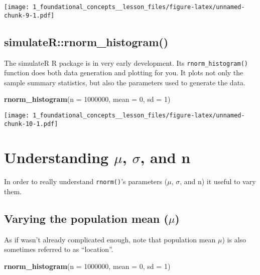 \documentclass[
]{article}
\newenvironment{Shaded}{\begin{snugshade}}{\end{snugshade}}
\newcommand{\AttributeTok}[1]{\textcolor[rgb]{0.13,0.29,0.53}{#1}}
\newcommand{\DecValTok}[1]{\textcolor[rgb]{0.00,0.00,0.81}{#1}}
\newcommand{\FunctionTok}[1]{\textcolor[rgb]{0.13,0.29,0.53}{\textbf{#1}}}
\newcommand{\NormalTok}[1]{#1}
\begin{document}
\texttt{[image: 1\_foundational\_concepts\_\_lesson\_files/figure-latex/unnamed-chunk-9-1.pdf]}

\hypertarget{simulaterrnorm_histogram}{%
\subsection{simulateR::rnorm\_histogram()}\label{simulaterrnorm_histogram}}

The simulateR R package is in very early development. Its
\texttt{rnorm\_histogram()} function does both data generation and
plotting for you. It plots not only the sample summary statistics, but
also the parameters used to generate the data.

\begin{Shaded}
\begin{Highlighting}[]
\FunctionTok{rnorm\_histogram}\NormalTok{(}\AttributeTok{n =} \DecValTok{1000000}\NormalTok{, }
                \AttributeTok{mean =} \DecValTok{0}\NormalTok{, }
                \AttributeTok{sd =} \DecValTok{1}\NormalTok{)}
\end{Highlighting}
\end{Shaded}

\texttt{[image: 1\_foundational\_concepts\_\_lesson\_files/figure-latex/unnamed-chunk-10-1.pdf]}

\hypertarget{understanding-mu-sigma-and-n}{%
\section{\texorpdfstring{Understanding \(\mu\), \(\sigma\), and
n}{Understanding \textbackslash mu, \textbackslash sigma, and n}}\label{understanding-mu-sigma-and-n}}

In order to really understand \texttt{rnorm()}'s parameters (\(\mu\),
\(\sigma\), and n) it useful to vary them.

\hypertarget{varying-the-population-mean-mu}{%
\subsection{\texorpdfstring{Varying the population mean
(\(\mu\))}{Varying the population mean (\textbackslash mu)}}\label{varying-the-population-mean-mu}}

As if wasn't already complicated enough, note that population mean
\(\mu\)) is also sometimes referred to as ``location''.

\begin{Shaded}
\begin{Highlighting}[]
\FunctionTok{rnorm\_histogram}\NormalTok{(}\AttributeTok{n =} \DecValTok{1000000}\NormalTok{, }
                \AttributeTok{mean =} \DecValTok{0}\NormalTok{, }
                \AttributeTok{sd =} \DecValTok{1}\NormalTok{) }
\end{Highlighting}
\end{Shaded}
\end{document}

